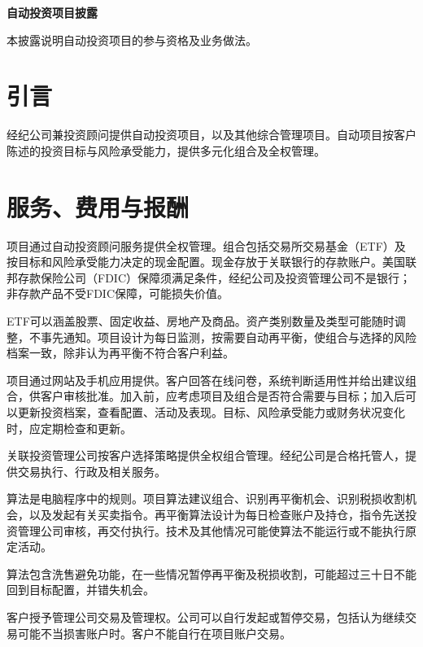 \documentclass[UTF8,fontset=none,11pt,a4paper]{ctexart}
\begin{document}
{\noindent\fontsize{20}{25}\selectfont\bfseries 自动投资项目披露\par}
\vspace{10pt}
本披露说明自动投资项目的参与资格及业\allowbreak\mbox{务做法。}


\section*{引言}
经纪公司兼投资顾问提供自动投资项目，以及其他综合管理项目。自动项目按客户陈述的投资目标与风险承受能力，提供多元化组合及\allowbreak\mbox{全权管理。}


\section*{服务、费用与报酬}
项目通过自动投资顾问服务提供全权管理。组合包括交易所交易基金（ETF）及按目标和风险承受能力决定的现金配置。现金存放于关联银行的存款账户。美国联邦存款保险公司（FDIC）保障须满足条件，经纪公司及投资管理公司不是银行；非存款产品不受FDIC保障，可能损\allowbreak\mbox{失价值。}


ETF可以涵盖股票、固定收益、房地产及商品。资产类别数量及类型可能随时调整，不事先通知。项目设计为每日监测，按需要自动再平衡，使组合与选择的风险档案一致，除非认为再平衡不符合\allowbreak\mbox{客户利益。}


项目通过网站及手机应用提供。客户回答在线问卷，系统判断适用性并给出建议组合，供客户审核批准。加入前，应考虑项目及组合是否符合需要与目标；加入后可以更新投资档案，查看配置、活动及表现。目标、风险承受能力或财务状况变化时，应定期检\allowbreak\mbox{查和更新。}


关联投资管理公司按客户选择策略提供全权组合管理。经纪公司是合格托管人，提供交易执行、行政及\allowbreak\mbox{相关服务。}


算法是电脑程序中的规则。项目算法建议组合、识别再平衡机会、识别税损收割机会，以及发起有关买卖指令。再平衡算法设计为每日检查账户及持仓，指令先送投资管理公司审核，再交付执行。技术及其他情况可能使算法不能运行或不能执行\allowbreak\mbox{原定活动。}


算法包含洗售避免功能，在一些情况暂停再平衡及税损收割，可能超过三十日不能回到目标配置，并\allowbreak\mbox{错失机会。}


客户授予管理公司交易及管理权。公司可以自行发起或暂停交易，包括认为继续交易可能不当损害账户时。客户不能自行在项目\allowbreak\mbox{账户交易。}
\end{document}
